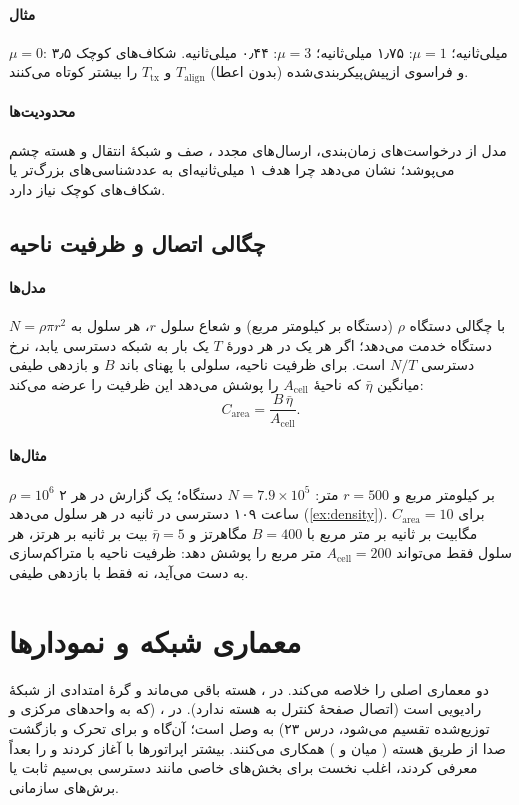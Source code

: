 \documentclass[11pt,a4paper]{article}
\begin{document}
\paragraph{مثال} $\mu = 0$: ۳٫۵ میلی‌ثانیه؛ $\mu = 1$: ۱٫۷۵ میلی‌ثانیه؛ $\mu = 3$: ۰٫۴۴ میلی‌ثانیه. شکاف‌های کوچک و فراسوی
ازپیش‌پیکربندی‌شده (بدون اعطا) $T_{\mathrm{align}}$ و $T_{\mathrm{tx}}$ را بیشتر کوتاه می‌کنند.
\paragraph{محدودیت‌ها} مدل از درخواست‌های زمان‌بندی، ارسال‌های مجدد ، صف و شبکهٔ انتقال و هسته چشم می‌پوشد؛ نشان
می‌دهد چرا هدف ۱ میلی‌ثانیه‌ای  به عددشناسی‌های بزرگ‌تر یا شکاف‌های کوچک نیاز دارد.

\subsection{چگالی اتصال و ظرفیت ناحیه}\label{sec:density}
\paragraph{مدل‌ها} با چگالی دستگاه $\rho$ (دستگاه بر کیلومتر مربع) و شعاع سلول $r$، هر سلول به $N = \rho\pi r^2$ دستگاه خدمت
می‌دهد؛ اگر هر یک در هر دورهٔ $T$ یک بار به شبکه دسترسی یابد، نرخ دسترسی $N/T$ است. برای ظرفیت ناحیه، سلولی با پهنای باند
$B$ و بازدهی طیفی میانگین $\bar\eta$ که ناحیهٔ $A_{\mathrm{cell}}$ را پوشش می‌دهد این ظرفیت را عرضه می‌کند:
\begin{equation}\label{eq:area}
  C_{\mathrm{area}} = \frac{B\,\bar\eta}{A_{\mathrm{cell}}}.
\end{equation}
\paragraph{مثال‌ها} $\rho = 10^6$ بر کیلومتر مربع و $r = 500$ متر: $N = 7.9\times10^5$ دستگاه؛ یک گزارش در هر ۲ ساعت ۱۰۹
دسترسی در ثانیه در هر سلول می‌دهد (\cref{ex:density}). برای $C_{\mathrm{area}} = 10$ مگابیت بر ثانیه بر متر مربع با
$B = 400$ مگاهرتز و $\bar\eta = 5$ بیت بر ثانیه بر هرتز، هر سلول فقط می‌تواند $A_{\mathrm{cell}} = 200$ متر مربع را پوشش دهد:
ظرفیت ناحیه با متراکم‌سازی به دست می‌آید، نه فقط با بازدهی طیفی.

\section{معماری شبکه و نمودارها}
 دو معماری اصلی را خلاصه می‌کند. در ،  هسته باقی می‌ماند و گرهٔ  امتدادی از
شبکهٔ رادیویی  است (اتصال صفحهٔ کنترل به هسته ندارد). در ،  (که به واحدهای مرکزی و توزیع‌شده
تقسیم می‌شود، درس ۲۳) به  وصل است؛ آن‌گاه  و  برای تحرک و بازگشت صدا از طریق هسته ( میان
 و ) همکاری می‌کنند. بیشتر اپراتورها با  آغاز کردند و  را بعداً معرفی کردند، اغلب
نخست برای بخش‌های خاصی مانند دسترسی بی‌سیم ثابت یا برش‌های سازمانی.
\end{document}
